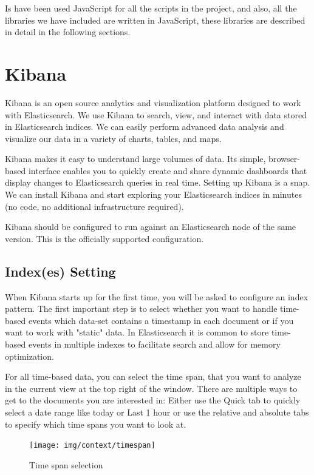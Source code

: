 \documentclass[a4paper, 12pt]{book}
\begin{document}
Is have been used JavaScript for all the scripts in the project, and also, all the libraries we have included are written in JavaScript, these libraries are described in detail in the following sections.  

 \section{Kibana}
\label{sec:kibana}
Kibana is an open source analytics and visualization platform designed to work with Elasticsearch. We use Kibana to search, view, and interact with data stored in Elasticsearch indices. We can easily perform advanced data analysis and visualize our data in a variety of charts, tables, and maps.

Kibana makes it easy to understand large volumes of data. Its simple, browser-based interface enables you to quickly create and share dynamic dashboards that display changes to Elasticsearch queries in real time. 	Setting up Kibana is a snap. We can install Kibana and start exploring your Elasticsearch indices in minutes (no code, no additional infrastructure required).

Kibana should be configured to run against an Elasticsearch node of the same version. This is the officially supported configuration.

\subsection{Index(es) Setting}
When Kibana starts up for the first time, you will be asked to configure an index pattern. The first important step is to select whether you want to handle time-based events which data-set contains a timestamp in each document or if you want to work with "static" data. In Elasticsearch it is common to store time-based events in multiple indexes to facilitate search and allow for memory optimization.

For all time-based data, you can select the time span, that you want to analyze in the current view at the top right of the window. There are multiple ways to get to the documents you are interested in: Either use the Quick tab to quickly select a date range like today or Last 1 hour or use the relative and absolute tabs to specify which time spans you want to look at.

\begin{figure}[H]
  \centering
  \texttt{[image: img/context/timespan]}
  \caption{Time span selection}
  \label{fig:timespan}
\end{figure}
\end{document}
